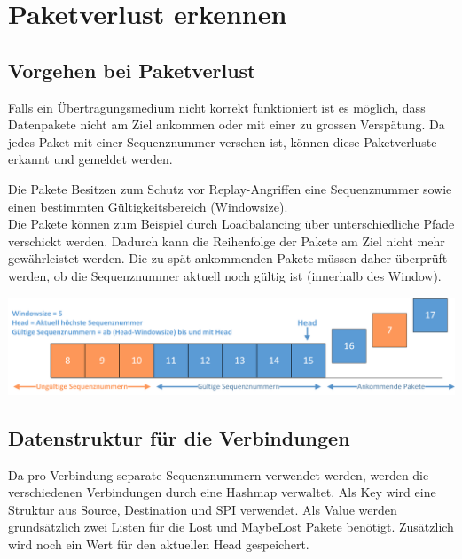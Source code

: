 \section{Paketverlust erkennen}
\label{sec:Paketverlust erkennen}

\subsection{Vorgehen bei Paketverlust}

{\raggedright
Falls ein \"{U}bertragungsmedium nicht korrekt funktioniert ist es m\"{o}glich,
dass Datenpakete nicht am Ziel ankommen oder mit einer zu grossen Versp\"{a}tung.
Da jedes \esp Paket mit einer Sequenznummer versehen ist, k\"{o}nnen diese
Paketverluste erkannt und gemeldet werden.
}

{\raggedright
Die \esp Pakete Besitzen zum Schutz vor Replay-Angriffen eine Sequenznummer sowie
einen bestimmten G\"{u}ltigkeitsbereich (Windowsize).
\\
Die Pakete k\"{o}nnen zum Beispiel durch Loadbalancing \"{u}ber unterschiedliche
Pfade verschickt werden. Dadurch kann die Reihenfolge der Pakete am Ziel nicht
mehr gew\"{a}hrleistet werden. Die zu sp\"{a}t ankommenden Pakete m\"{u}ssen
daher \"{u}berpr\"{u}ft werden, ob die Sequenznummer aktuell noch g\"{u}ltig ist
(innerhalb des Window).
}

\includegraphics[width=1\textwidth]{start/img/Sequenznummern.png}

\subsection{Datenstruktur für die \esp Verbindungen}
Da pro Verbindung separate Sequenznummern verwendet werden, werden die verschiedenen Verbindungen durch eine Hashmap verwaltet. Als Key wird eine Struktur aus Source, Destination und \acs{SPI} verwendet. Als Value werden grundsätzlich zwei Listen für die Lost und MaybeLost Pakete benötigt. Zusätzlich wird noch ein Wert für den aktuellen Head gespeichert.

